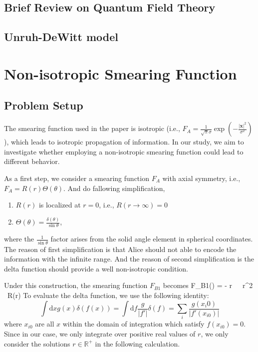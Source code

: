 \documentclass[a4paper,12pt]{article}
\begin{document}
\subsection{Brief Review on Quantum Field Theory}
\subsection{Unruh-DeWitt model}

\section{Non-isotropic Smearing Function}
\subsection{Problem Setup}
The smearing function used in the paper is isotropic (i.e., $F_A = \frac{1}{\sqrt{\pi}\sigma} \exp\left(-\frac{|\mathbf{x}|^2}{\sigma^2}\right)$), which leads to isotropic propagation of information. In our study, we aim to investigate whether employing a non-isotropic smearing function could lead to different behavior.

As a first step, we consider a smearing function $F_A$ with axial symmetry, i.e., $F_A = R(r)\Theta(\theta)$.
And do fallowing simplification, 
\begin{enumerate}
  \item $R(r)$ is localized at $r = 0$, i.e., $R(r \rightarrow \infty) = 0$
  \item $\Theta(\theta) = \frac{\delta(\theta)}{\sin{\theta}}$,
\end{enumerate}
where the $\frac{1}{\sin\theta}$ factor arises from the solid angle element in spherical coordinates.
The reason of first simplification is that Alice should not able to encode the information with the infinite range. And the reason of second simplification is the delta function should provide a well non-isotropic condition.

Under this construction, the smearing function $F_{B1}$ becomes
\be
    F_{B1}() = - \int {}r\, \theta\, \phi\, r^2 \sin{\theta} \, R(r)\frac{\delta(\theta)}{\sin{\theta}} 
\ee
To evaluate the delta function, we use the following identity:
\[
    \int \mathrm{d}x g(x) \delta(f(x)) = \int \mathrm{d}f \frac{g}{\left|f'\right|} \delta(f) = \sum_i\frac{g(x_i0)}{\left|f'(x_{i0})\right|}
\]
where $x_{i0}$ are all $x$ within the domain of integration which satisfy $f(x_{i0}) = 0$. Since in our case, we only integrate over positive real values of $r$, we only consider the solutions $r \in \mathbb{R}^+$ in the following calculation.
\end{document}
